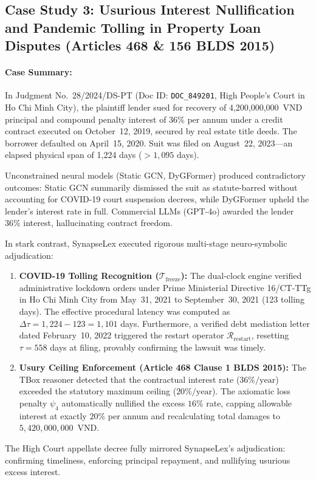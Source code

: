 \documentclass[11pt,a4paper]{article}
\begin{document}
\subsection{Case Study 3: Usurious Interest Nullification and Pandemic Tolling in Property Loan Disputes (Articles 468 \& 156 BLDS 2015)}
\paragraph{Case Summary:} In Judgment No.~28/2024/DS-PT (Doc ID: \texttt{DOC\_849201}, High People's Court in Ho Chi Minh City), the plaintiff lender sued for recovery of 4,200,000,000~VND principal and compound penalty interest of 36\% per annum under a credit contract executed on October~12, 2019, secured by real estate title deeds. The borrower defaulted on April~15, 2020. Suit was filed on August~22, 2023---an elapsed physical span of 1,224 days ($> 1,095$ days). 

Unconstrained neural models (Static GCN, DyGFormer) produced contradictory outcomes: Static GCN summarily dismissed the suit as statute-barred without accounting for COVID-19 court suspension decrees, while DyGFormer upheld the lender's interest rate in full. Commercial LLMs (GPT-4o) awarded the lender 36\% interest, hallucinating contract freedom.

In stark contrast, SynapseLex executed rigorous multi-stage neuro-symbolic adjudication:
\begin{enumerate}[label=(\roman*)]
    \item \textbf{COVID-19 Tolling Recognition ($\mathcal{T}_{\text{freeze}}$):} The dual-clock engine verified administrative lockdown orders under Prime Ministerial Directive 16/CT-TTg in Ho Chi Minh City from May~31, 2021 to September~30, 2021 (123 tolling days). The effective procedural latency was computed as $\Delta \tau = 1,224 - 123 = 1,101$ days. Furthermore, a verified debt mediation letter dated February~10, 2022 triggered the restart operator $\mathcal{R}_{\text{restart}}$, resetting $\tau = 558$ days at filing, provably confirming the lawsuit was timely.
    \item \textbf{Usury Ceiling Enforcement (Article 468 Clause 1 BLDS 2015):} The TBox reasoner detected that the contractual interest rate ($36\%/\text{year}$) exceeded the statutory maximum ceiling ($20\%/\text{year}$). The axiomatic loss penalty $\psi_4$ automatically nullified the excess $16\%$ rate, capping allowable interest at exactly $20\%$ per annum and recalculating total damages to $5,420,000,000$~VND.
\end{enumerate}
The High Court appellate decree fully mirrored SynapseLex's adjudication: confirming timeliness, enforcing principal repayment, and nullifying usurious excess interest.
\end{document}
